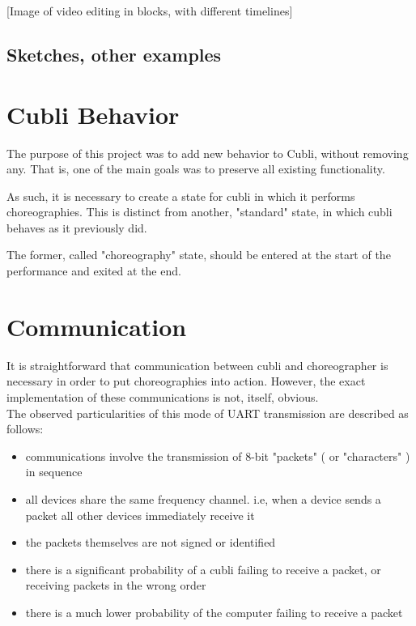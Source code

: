 [Image of video editing in blocks, with different timelines]\\


\subsection{Sketches, other examples}

\section{Cubli Behavior}

The purpose of this project was to add new behavior to Cubli, without removing any. That is, one of the main goals was to preserve all existing functionality.

As such, it is necessary to create a state for cubli in which it performs choreographies. This is distinct from another, "standard" state, in which cubli behaves as it previously did.

The former, called "choreography" state, should be entered at the start of the performance and exited at the end.

\section{Communication}

It is straightforward that communication between cubli and choreographer is necessary in order to put choreographies into action. However, the exact implementation of these communications is not, itself, obvious.\\

The observed particularities of this mode of UART transmission are described as follows:
\begin{itemize}
\item communications involve the transmission of 8-bit "packets" ( or "characters" ) in sequence
\item all devices share the same frequency channel. i.e, when a device sends a packet all other devices immediately receive it
\item the packets themselves are not signed or identified
\item there is a significant probability of a cubli failing to receive a packet, or receiving packets in the wrong order
\item there is a much lower probability of the computer failing to receive a packet
\end{itemize}

